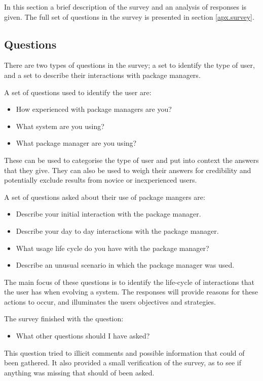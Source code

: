 In this section a brief description of the survey and an analysis of responses is given.
The full set of questions in the survey is presented in section \ref{apx.survey}. 

\subsection{Questions}
There are two types of questions in the survey; a set to identify the type of user, and a set to describe their interactions with package managers.

A set of questions used to identify the user are:
\begin{itemize}
  \item How experienced with package managers are you? 
  \item What system are you using?
  \item What package manager are you using?
\end{itemize}
These can be used to categorise the type of user and put into context the answers that they give.
They can also be used to weigh their answers for credibility and potentially exclude results from novice or inexperienced users. 

A set of questions asked about their use of package mangers are:
\begin{itemize}
  \item Describe your initial interaction with the package manager.
  \item Describe your day to day interactions with the package manager.
  \item What usage life cycle do you have with the package manager?
  \item Describe an unusual scenario in which the package manager was used.
\end{itemize}
The main focus of these questions is to identify the life-cycle of interactions that the user has when evolving a system.
The responses will provide reasons for these actions to occur, and illuminates the users objectives and strategies.

The survey finished with the question:
\begin{itemize}
  \item What other questions should I have asked?
\end{itemize}
This question tried to illicit comments and possible information that could of been gathered.
It also provided a small verification of the survey, as to see if anything was missing that should of been asked.

